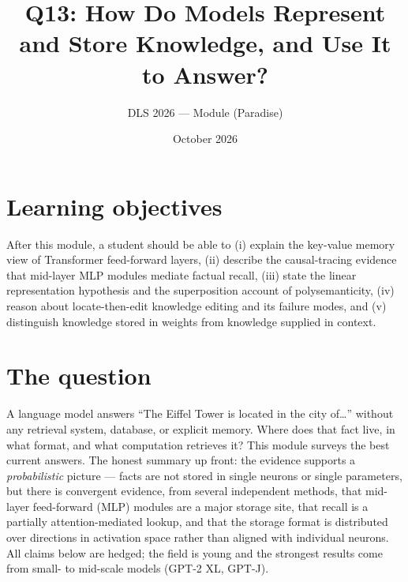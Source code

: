 \documentclass[11pt]{article}
\title{Q13: How Do Models Represent and Store Knowledge, and Use It to Answer?}
\author{DLS 2026 --- Module (Paradise)}
\date{October 2026}
\begin{document}
\maketitle

\section*{Learning objectives}
After this module, a student should be able to (i) explain the key-value memory view of Transformer feed-forward layers, (ii) describe the causal-tracing evidence that mid-layer MLP modules mediate factual recall, (iii) state the linear representation hypothesis and the superposition account of polysemanticity, (iv) reason about locate-then-edit knowledge editing and its failure modes, and (v) distinguish knowledge stored in weights from knowledge supplied in context.

\section{The question}
A language model answers ``The Eiffel Tower is located in the city of\dots'' without any retrieval system, database, or explicit memory. Where does that fact live, in what format, and what computation retrieves it? This module surveys the best current answers. The honest summary up front: the evidence supports a \emph{probabilistic} picture --- facts are not stored in single neurons or single parameters, but there is convergent evidence, from several independent methods, that mid-layer feed-forward (MLP) modules are a major storage site, that recall is a partially attention-mediated lookup, and that the storage format is distributed over directions in activation space rather than aligned with individual neurons. All claims below are hedged; the field is young and the strongest results come from small- to mid-scale models (GPT-2 XL, GPT-J).
\end{document}
